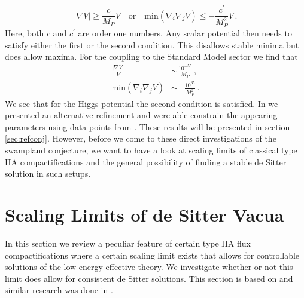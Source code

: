 \documentclass[a4paper,12pt]{report}
\newcommand{\be}{\begin{equation}}
\newcommand{\ee}{\end{equation}}
\newcommand{\bea}{\begin{equation}\begin{aligned}}
\newcommand{\eea}{\end{aligned}\end{equation}}
\begin{document}
\be
|\nabla V| \geq \frac{c}{M_P} V\quad \text{or} \quad \text{min}(\nabla_i \nabla_j V) \leq - \frac{c^\prime}{M_P^2} V\,.
\label{eq:dScon}
\ee
Here, both $c$ and $c^\prime$ are order one numbers. Any scalar potential then needs to satisfy either the first or the second condition. This disallows stable minima but does allow maxima. For the coupling to the Standard Model sector we find that 
\bea 
\frac{|\nabla V|}{V} &\sim \frac{10^{-55}}{M_P}\,,\\
\text{min}(\nabla_i \nabla_j V) &\sim -\frac{10^ {35}}{M_P^ 2}\,.
\eea 
We see that for the Higgs potential the second condition is satisfied. In \cite{Andriot:2018mav} we presented an alternative refinement and were able constrain the appearing parameters using data points from \cite{Roupec:2018mbn}. These results will be presented in section \ref{sec:refconj}. However, before we come to these direct investigations of the swampland conjecture, we want to have a look at scaling limits of classical type IIA compactifications and the general possibility of finding a stable de Sitter solution in such setups.

\section{Scaling Limits of de Sitter Vacua}
\label{sec:scaling}
In this section we review a peculiar feature of certain type IIA flux compactifications where a certain scaling limit exists that allows for controllable solutions of the low-energy effective theory. We investigate whether or not this limit does allow for consistent de Sitter solutions. This section is based on \cite{Banlaki:2018ayh} and similar research was done in \cite{Junghans:2018gdb}.
\end{document}
